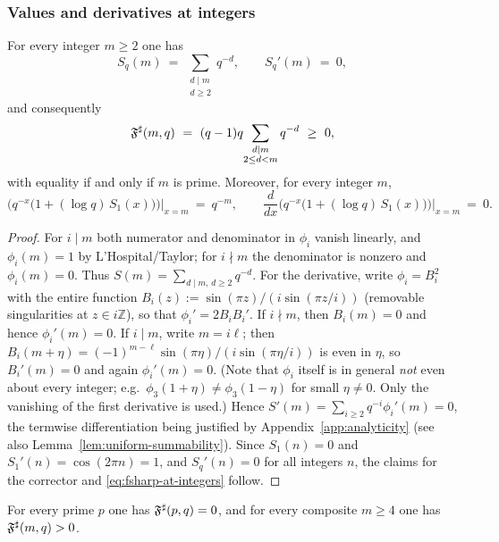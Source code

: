 \subsubsection{Values and derivatives at integers}

\begin{lemma}\label{lem:int-values}
For every integer $m\ge2$ one has
\[
S_q(m)\ =\ \sum_{\substack{d\mid m\\ d\ge 2}} q^{-d},
\qquad
S_q'(m)\ =\ 0,
\]
and consequently
\begin{equation}\label{eq:fsharp-at-integers}
\Fsharp(m,q)\ =\ (q-1)q\!\sum_{\substack{d\mid m\\ 2\le d<m}} q^{-d}\ \ge\ 0,
\end{equation}
with equality if and only if $m$ is prime. Moreover, for every integer $m$,
\[
\big(q^{-x}\bigl(1+(\log q)\,S_1(x)\bigr)\big)\Big|_{x=m}\ =\ q^{-m},
\qquad
\frac{d}{dx}\Big(q^{-x}\bigl(1+(\log q)\,S_1(x)\bigr)\Big)\Big|_{x=m}\ =\ 0.
\]
\end{lemma}


\begin{proof}
For $i\mid m$ both numerator and denominator in $\phi_i$ vanish linearly, and $\phi_i(m)=1$ by L’Hospital/Taylor; for $i\nmid m$ the denominator is nonzero and $\phi_i(m)=0$. Thus $S(m)=\sum_{d\mid m,\,d\ge2}q^{-d}$. For the derivative, write $\phi_i=B_i^2$ with the entire function $B_i(z):=\sin(\pi z)/(i\sin(\pi z/i))$ (removable singularities at $z\in i\mathbb Z$), so that $\phi_i'=2B_iB_i'$. If $i\nmid m$, then $B_i(m)=0$ and hence $\phi_i'(m)=0$. If $i\mid m$, write $m=i\ell$; then $B_i(m+\eta)=(-1)^{m-\ell}\sin(\pi\eta)/(i\sin(\pi\eta/i))$ is even in $\eta$, so $B_i'(m)=0$ and again $\phi_i'(m)=0$. (Note that $\phi_i$ itself is in general \emph{not} even about every integer; e.g.\ $\phi_3(1+\eta)\neq\phi_3(1-\eta)$ for small $\eta\neq0$. Only the vanishing of the first derivative is used.) Hence $S'(m)=\sum_{i\ge2}q^{-i}\phi_i'(m)=0$, the termwise differentiation being justified by Appendix~\ref{app:analyticity} (see also Lemma~\ref{lem:uniform-summability}). Since $S_1(n)=0$ and $S_1'(n)=\cos(2\pi n)=1$, and $S_q'(n)=0$ for all integers $n$, the claims for the corrector and \eqref{eq:fsharp-at-integers} follow.
\end{proof}

\begin{corollary}\label{cor:prime-anchors}
For every prime $p$ one has $\mathfrak F^{\sharp}(p,q)=0$, and for every composite $m\ge4$ one has $\mathfrak F^{\sharp}(m,q)>0$.
\end{corollary}

